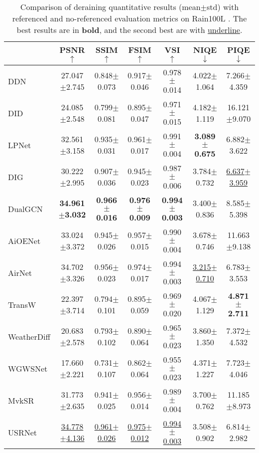 \documentclass[final,12pt]{elsarticle}
\begin{document}
    \begin{table}[t]
        \centering
        \scriptsize
        \caption{Comparison of deraining quantitative results (mean$\pm$std) with referenced and no-referenced evaluation metrics on Rain100L \citep{yang2019joint}. The best results are in \textbf{bold}, and the second best are with \underline{underline}.}
        \begin{tabular}{l|cccc|cc}
        \hline
        & PSNR $\uparrow$ & SSIM $\uparrow$ & FSIM $\uparrow$ & VSI $\uparrow$ & NIQE $\downarrow$ & PIQE $\downarrow$\\ \hline\hline
        DDN \citep{fu2017removing}              & 27.047$\pm$2.745 & 0.848$\pm$0.073 & 0.917$\pm$0.046 & 0.978$\pm$0.014 & 4.022$\pm$1.064 & 7.266$\pm$4.359   \\ 
        DID \citep{zhang2018density}              & 24.085$\pm$2.548 & 0.799$\pm$0.081 & 0.895$\pm$0.047 & 0.971$\pm$0.015 & 4.182$\pm$1.119 & 16.121$\pm$9.070 \\ 
        LPNet \citep{fu2019lightweight}            & 32.561$\pm$3.158 & 0.935$\pm$0.031 & 0.961$\pm$0.017 & 0.991$\pm$0.004 & \textbf{3.089$\pm$0.675} & 6.882$\pm$3.622   \\ 
        DIG \citep{ran2020single}             & 30.222$\pm$2.995 & 0.907$\pm$0.036 & 0.945$\pm$0.023 & 0.987$\pm$0.006 & 3.784$\pm$0.732 & \underline{6.637$\pm$3.959}   \\ 
        DualGCN \citep{fu2021rain}            & \textbf{34.961$\pm$3.032}  & \textbf{0.966$\pm$0.016}  & \textbf{0.976$\pm$0.009}  & \textbf{0.994$\pm$0.003}  & 3.400$\pm$0.836  & 8.585$\pm$5.398   \\ 
        AiOENet \citep{liu2023aioenet}          & 33.024$\pm$3.372 & 0.945$\pm$0.026 & 0.957$\pm$0.015 & 0.990$\pm$0.004 & 3.678$\pm$0.746 & 11.663$\pm$9.138  \\ 
        AirNet \citep{li2022all}           & 34.702$\pm$3.326 & 0.956$\pm$0.023 & 0.974$\pm$0.017 & 0.994$\pm$0.003 & \underline{3.215$\pm$0.710} & 6.783$\pm$3.553   \\ 
        TransW \citep{valanarasu2022transweather}     & 22.397$\pm$3.714 & 0.794$\pm$0.101 & 0.895$\pm$0.059 & 0.969$\pm$0.020 & 4.067$\pm$1.129 & \textbf{4.871$\pm$2.711}   \\ 
        WeatherDiff \citep{ozdenizci2023restoring} & 20.683$\pm$2.578 & 0.793$\pm$0.102 & 0.890$\pm$0.064 & 0.965$\pm$0.023 & 3.860$\pm$1.350 & 7.372$\pm$4.532   \\ 
        WGWSNet \citep{zhu2023learning}          & 17.660$\pm$2.221 & 0.731$\pm$0.107 & 0.862$\pm$0.064 & 0.955$\pm$0.023 & 4.371$\pm$1.227 & 7.723$\pm$4.046   \\ 
        MvkSR \citep{xu2024mvksr}            & 31.773$\pm$2.635 & 0.941$\pm$0.025 & 0.956$\pm$0.014 & 0.989$\pm$0.004 & 3.700$\pm$0.762 & 11.185$\pm$8.973  \\ \hline
        USRNet          & \underline{34.778$\pm$4.136} 	& \underline{0.961$\pm$0.026} 	& \underline{0.975$\pm$0.012} 	& \underline{0.994$\pm$0.003} 	& 3.508$\pm$0.902 	& 6.814$\pm$2.982                    \\ \hline
        \end{tabular}\label{table:deraining}
    \end{table}
\end{document}
